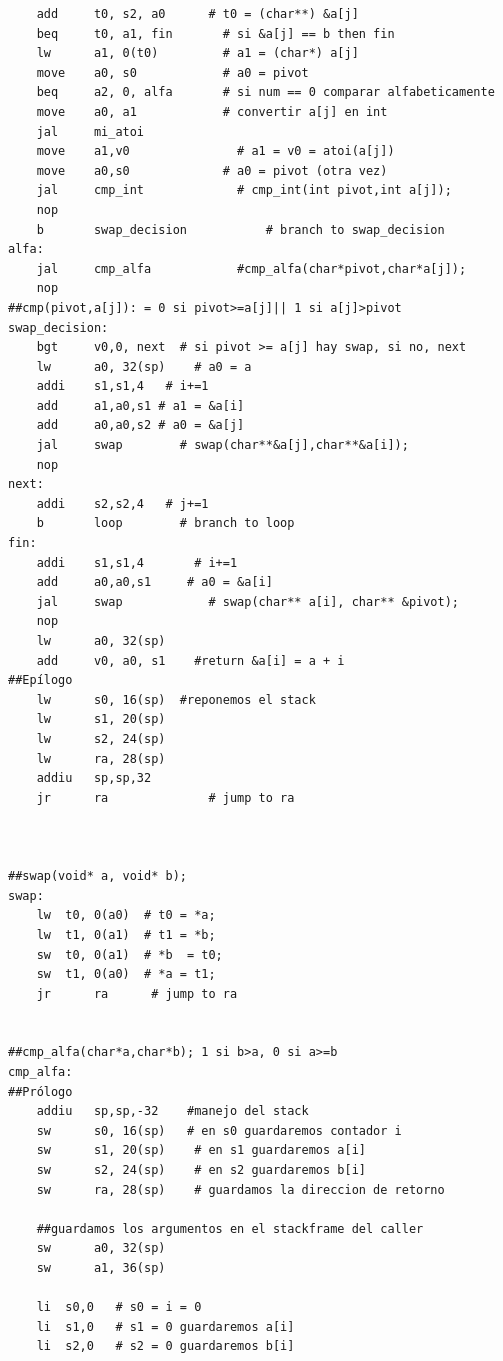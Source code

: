 \documentclass[a4paper,10pt]{article}
\numberwithin{equation}{section}
\numberwithin{figure}{section}
\begin{document}
\begin{lstlisting}
    add		t0, s2, a0		# t0 = (char**) &a[j]
    beq     t0, a1, fin       # si &a[j] == b then fin
    lw      a1, 0(t0)         # a1 = (char*) a[j]
    move    a0, s0            # a0 = pivot
    beq     a2, 0, alfa       # si num == 0 comparar alfabeticamente
    move    a0, a1            # convertir a[j] en int
    jal     mi_atoi
    move 	a1,v0		        # a1 = v0 = atoi(a[j])
    move    a0,s0             # a0 = pivot (otra vez)
    jal		cmp_int             # cmp_int(int pivot,int a[j]);
    nop
    b		swap_decision			# branch to swap_decision
alfa:
    jal     cmp_alfa            #cmp_alfa(char*pivot,char*a[j]);
    nop
##cmp(pivot,a[j]): = 0 si pivot>=a[j]|| 1 si a[j]>pivot
swap_decision:
    bgt		v0,0, next	# si pivot >= a[j] hay swap, si no, next
    lw      a0, 32(sp)    # a0 = a
    addi    s1,s1,4   # i+=1
    add     a1,a0,s1 # a1 = &a[i]
    add     a0,a0,s2 # a0 = &a[j]
    jal     swap        # swap(char**&a[j],char**&a[i]);
    nop
next:
    addi    s2,s2,4   # j+=1
    b		loop		# branch to loop
fin:
    addi    s1,s1,4       # i+=1
    add     a0,a0,s1     # a0 = &a[i]
    jal     swap            # swap(char** a[i], char** &pivot);
    nop
    lw      a0, 32(sp)
    add     v0, a0, s1    #return &a[i] = a + i
##Epílogo
    lw		s0, 16(sp)	#reponemos el stack 
    lw      s1, 20(sp)
    lw      s2, 24(sp)
    lw      ra, 28(sp)
    addiu   sp,sp,32
    jr		ra				# jump to ra
    


##swap(void* a, void* b);
swap:
    lw  t0, 0(a0)  # t0 = *a;
    lw  t1, 0(a1)  # t1 = *b;
    sw  t0, 0(a1)  # *b  = t0;
    sw  t1, 0(a0)  # *a = t1;
    jr		ra		# jump to ra
    

##cmp_alfa(char*a,char*b); 1 si b>a, 0 si a>=b
cmp_alfa:
##Prólogo
    addiu   sp,sp,-32    #manejo del stack
    sw		s0, 16(sp)	 # en s0 guardaremos contador i	
    sw      s1, 20(sp)    # en s1 guardaremos a[i]
    sw      s2, 24(sp)    # en s2 guardaremos b[i]
    sw      ra, 28(sp)    # guardamos la direccion de retorno
    
    ##guardamos los argumentos en el stackframe del caller
    sw      a0, 32(sp)    
    sw      a1, 36(sp)

    li  s0,0   # s0 = i = 0
    li  s1,0   # s1 = 0 guardaremos a[i]
    li  s2,0   # s2 = 0 guardaremos b[i]


\end{lstlisting}
\end{document}
